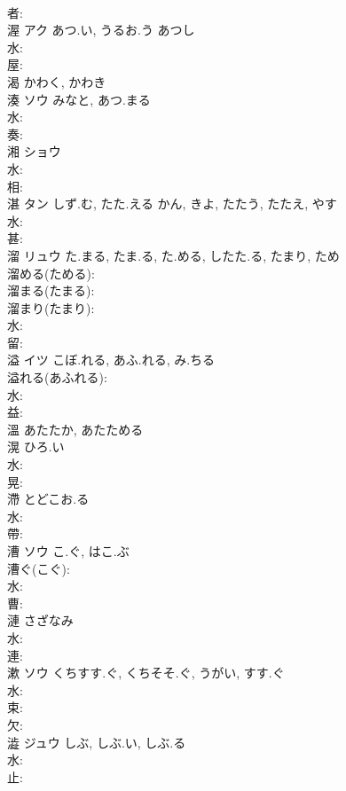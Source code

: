 \documentclass[8pt]{extreport}
\begin{document}
\begin{CJK}{UTF8}{min}
\\	者: 
\\	渥	アク	あつ.い, うるお.う	あつし	
\\	水: 
\\	屋: 
\\	渴		かわく, かわき				
\\	湊	ソウ	みなと, あつ.まる		
\\	水: 
\\	奏: 
\\	湘	ショウ			
\\	水: 
\\	相: 
\\	湛	タン	しず.む, たた.える	かん, きよ, たたう, たたえ, やす	
\\	水: 
\\	甚: 
\\	溜	リュウ	た.まる, たま.る, た.める, したた.る, たまり, ため		
\\	溜める(ためる): 
\\	溜まる(たまる): 
\\	溜まり(たまり): 
\\	水: 
\\	留: 
\\	溢	イツ	こぼ.れる, あふ.れる, み.ちる		
\\	溢れる(あふれる): 
\\	水: 
\\	益: 
\\	溫		あたたか, あたためる				
\\	滉		ひろ.い			
\\	水: 
\\	晃: 
\\	滯		とどこお.る				
\\	水: 
\\	帶: 
\\	漕	ソウ	こ.ぐ, はこ.ぶ		
\\	漕ぐ(こぐ): 
\\	水: 
\\	曹: 
\\	漣		さざなみ				
\\	水: 
\\	連: 
\\	漱	ソウ	くちすす.ぐ, くちそそ.ぐ, うがい, すす.ぐ		
\\	水: 
\\	束: 
\\	欠: 
\\	澁	ジュウ	しぶ, しぶ.い, しぶ.る				
\\	水: 
\\	止: 

\end{CJK}
\end{document}
